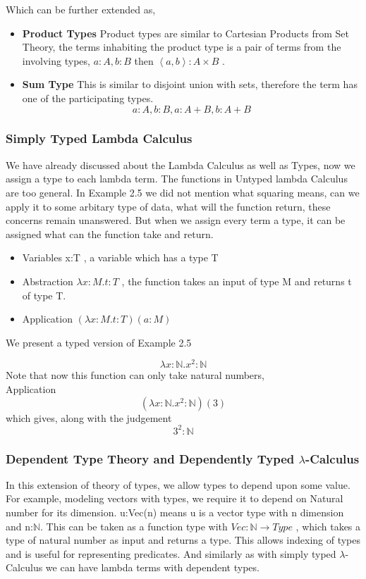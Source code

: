 \documentclass[12pt]{article}
\begin{document}
Which can be further extended as,
\begin{itemize}
    \item \textbf{Product Types} Product types are similar to Cartesian Products from Set Theory, the terms inhabiting the product type is a pair of terms from the involving types, $a:A, b:B $ then $ \left\langle a,b \right\rangle : A \times B$ .
    \item \textbf{Sum Type} This is similar to disjoint union with sets, therefore the term has one of the participating types. 
     $$a:A, b:B, a:A+B, b:A+B$$

    
\end{itemize}
\subsubsection{Simply Typed Lambda Calculus}
 We have already discussed about the Lambda Calculus as well as Types, now we assign a type to each lambda term. The functions in Untyped lambda Calculus are too general. In Example 2.5 we did not mention what squaring means, can we apply it to some arbitary type of data, what will the function return, these concerns remain unanswered. But when we assign every term a type, it can be assigned what can the function take and return.
 \begin{itemize}
    \item Variables  x:T , a variable which has a type T
    \item Abstraction $\lambda x:M.t:T$ , the function takes an input of type M and returns t of type T.
    \item Application $(\lambda x:M.t:T)(a:M)$
    


 \end{itemize}
 
 We present a typed version of Example 2.5\\
 \begin{example}
    $$\lambda x:\mathbb{N}.x^2:\mathbb{N}$$
    Note that now this function can only take natural numbers,\\
    Application
    $$(\lambda x:\mathbb{N}.x^2:\mathbb{N})(3)$$
    which gives, along with the judgement
    $$3^2:\mathbb{N}$$
 \end{example}

\subsubsection{Dependent Type Theory and Dependently Typed $\lambda$-Calculus}
In this extension of theory of types, we allow types to depend upon some value. For example, modeling vectors with types, we require it to depend on Natural number for its dimension. 
u:Vec(n) means u is a vector type with n dimension and n:$\mathbb{N}$. 
This can be taken as a function type with $Vec:\mathbb{N} \to Type$ , which takes a type of natural number as input and returns a type. This allows indexing of types and is useful for representing predicates.
And similarly as with simply typed $\lambda$-Calculus we can have lambda terms with dependent types. 
\end{document}
